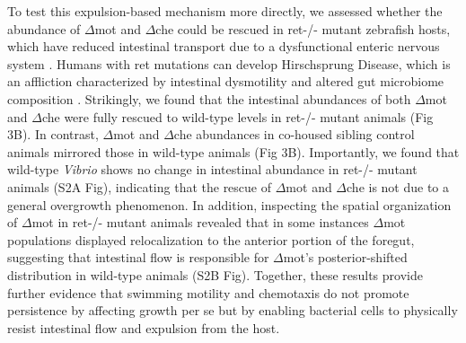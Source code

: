 {{{To test this expulsion-based mechanism more directly, we assessed whether the abundance of $\Delta$mot and $\Delta$che could be rescued in ret-/- mutant zebrafish hosts, which have reduced intestinal transport due to a dysfunctional enteric nervous system \cite{wiles_host_2016,ganz_image_2018}. Humans with ret mutations can develop Hirschsprung Disease, which is an affliction characterized by intestinal dysmotility and altered gut microbiome composition \cite{gosain_hirschsprungs_2015,heanue_enteric_2007}. Strikingly, we found that the intestinal abundances of both $\Delta$mot and $\Delta$che were fully rescued to wild-type levels in ret-/- mutant animals (Fig 3B). In contrast, $\Delta$mot and $\Delta$che abundances in co-housed sibling control animals mirrored those in wild-type animals (Fig 3B). Importantly, we found that wild-type \textit{Vibrio} shows no change in intestinal abundance in ret-/- mutant animals (S2A Fig), indicating that the rescue of $\Delta$mot and $\Delta$che is not due to a general overgrowth phenomenon. In addition, inspecting the spatial organization of $\Delta$mot in ret-/- mutant animals revealed that in some instances $\Delta$mot populations displayed relocalization to the anterior portion of the foregut, suggesting that intestinal flow is responsible for $\Delta$mot's posterior-shifted distribution in wild-type animals (S2B Fig). Together, these results provide further evidence that swimming motility and chemotaxis do not promote persistence by affecting growth per se but by enabling bacterial cells to physically resist intestinal flow and expulsion from the host. 


}}}
